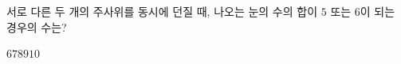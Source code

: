 \hspace*{2mm}\begin{minipage}[t]{\dimexpr\linewidth-2mm\relax}\vspace{0pt}
서로 다른 두 개의 주사위를 동시에 던질 때, 나오는 눈의 수의 합이 $5$ 또는 $6$이 되는 경우의 수는?
\begin{choices32}{$6$}{$7$}{$8$}{$9$}{$10$}\end{choices32}\end{minipage}
